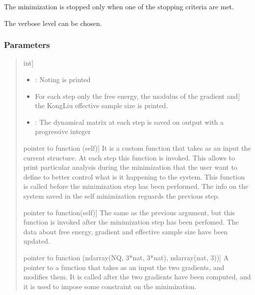 \documentclass[a4paper,11pt,english]{sphinxmanual}
\begin{document}
\begin{fulllineitems}
\begin{fulllineitems}
\sphinxAtStartPar
The minimization is stopped only when one of the stopping criteria are met.

\sphinxAtStartPar
The verbose level can be chosen.


\subsubsection{Parameters}
\label{\detokenize{apireference:id37}}\begin{quote}
\begin{description}
\sphinxlineitem{verbose}{[}int{]}\begin{description}
\begin{itemize}
\item {} 
 : Noting is printed

\item {} \begin{description}
\sphinxlineitem{1}{[}For each step only the free energy, the modulus of the gradient and{]}
\sphinxAtStartPar
the Kong\sphinxhyphen{}Liu effective sample size is printed.

\end{description}

\item {} 
 : The dynamical matrix at each step is saved on output with a progressive integer

\end{itemize}

\end{description}

\sphinxlineitem{custom\_function\_pre}{[}pointer to function (self){]}
\sphinxAtStartPar
It is a custom function that takes as an input the current
structure. At each step this function is invoked. This allows
to print particular analysis during the minimization that
the user want to define to better control what is it happening
to the system.
This function is called before the minimization step has been performed.
The info on the system saved in the self minimization reguards the previous step.

\sphinxlineitem{custom\_function\_post}{[}pointer to function(self){]}
\sphinxAtStartPar
The same as the previous argument, but this function is invoked after
the minimization step has been perfomed. The data about free energy,
gradient and effective sample size have been updated.

\sphinxlineitem{custom\_function\_gradient}{[}pointer to function (ndarray(NQ, 3*nat, 3*nat), ndarray(nat, 3)){]}
\sphinxAtStartPar
A pointer to a function that takes as an input the two gradients, and modifies them.
It is called after the two gradients have been computed, and it is used to
impose some constraint on the minimization.


\end{description}
\end{quote}
\end{fulllineitems}
\end{fulllineitems}
\end{document}
